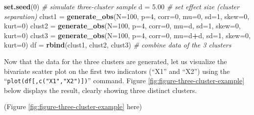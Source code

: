 \documentclass[
  man,floatsintext]{apa7}
\newenvironment{Shaded}{\begin{snugshade}}{\end{snugshade}}
\newcommand{\AttributeTok}[1]{\textcolor[rgb]{0.13,0.29,0.53}{#1}}
\newcommand{\CommentTok}[1]{\textcolor[rgb]{0.56,0.35,0.01}{\textit{#1}}}
\newcommand{\DecValTok}[1]{\textcolor[rgb]{0.00,0.00,0.81}{#1}}
\newcommand{\FloatTok}[1]{\textcolor[rgb]{0.00,0.00,0.81}{#1}}
\newcommand{\FunctionTok}[1]{\textcolor[rgb]{0.13,0.29,0.53}{\textbf{#1}}}
\newcommand{\NormalTok}[1]{#1}
\newcommand{\OtherTok}[1]{\textcolor[rgb]{0.56,0.35,0.01}{#1}}
\newcommand{\SpecialCharTok}[1]{\textcolor[rgb]{0.81,0.36,0.00}{\textbf{#1}}}
\begin{document}
\begin{Shaded}
\begin{Highlighting}[]
\FunctionTok{set.seed}\NormalTok{(}\DecValTok{0}\NormalTok{)}
\CommentTok{\# simulate three{-}cluster sample}
\NormalTok{d }\OtherTok{=} \FloatTok{5.00} \CommentTok{\# set effect size (cluster separation)}
\NormalTok{clust1 }\OtherTok{=} \FunctionTok{generate\_obs}\NormalTok{(}\AttributeTok{N=}\DecValTok{100}\NormalTok{, }\AttributeTok{p=}\DecValTok{4}\NormalTok{, }\AttributeTok{corr=}\DecValTok{0}\NormalTok{, }\AttributeTok{mu=}\DecValTok{0}\NormalTok{,   }\AttributeTok{sd=}\DecValTok{1}\NormalTok{, }\AttributeTok{skew=}\DecValTok{0}\NormalTok{, }\AttributeTok{kurt=}\DecValTok{0}\NormalTok{)}
\NormalTok{clust2 }\OtherTok{=} \FunctionTok{generate\_obs}\NormalTok{(}\AttributeTok{N=}\DecValTok{100}\NormalTok{, }\AttributeTok{p=}\DecValTok{4}\NormalTok{, }\AttributeTok{corr=}\DecValTok{0}\NormalTok{, }\AttributeTok{mu=}\NormalTok{d,   }\AttributeTok{sd=}\DecValTok{1}\NormalTok{, }\AttributeTok{skew=}\DecValTok{0}\NormalTok{, }\AttributeTok{kurt=}\DecValTok{0}\NormalTok{)}
\NormalTok{clust3 }\OtherTok{=} \FunctionTok{generate\_obs}\NormalTok{(}\AttributeTok{N=}\DecValTok{100}\NormalTok{, }\AttributeTok{p=}\DecValTok{4}\NormalTok{, }\AttributeTok{corr=}\DecValTok{0}\NormalTok{, }\AttributeTok{mu=}\NormalTok{d}\SpecialCharTok{+}\NormalTok{d, }\AttributeTok{sd=}\DecValTok{1}\NormalTok{, }\AttributeTok{skew=}\DecValTok{0}\NormalTok{, }\AttributeTok{kurt=}\DecValTok{0}\NormalTok{)}
\NormalTok{df }\OtherTok{=} \FunctionTok{rbind}\NormalTok{(clust1, clust2, clust3) }\CommentTok{\# combine data of the 3 clusters}
\end{Highlighting}
\end{Shaded}

Now that the data for the three clusters are generated, let us visualize the bivariate scatter plot on the first two indicators (``X1'' and ``X2'') using the ``\texttt{plot(df{[},c("X1","X2"){]})}'' command. Figure \ref{fig:figure-three-cluster-example} below displays the result, clearly showing three distinct clusters.

(Figure \ref{fig:figure-three-cluster-example} here)
\end{document}
